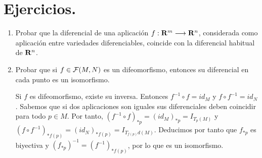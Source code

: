 \documentclass[cursovd_portada.tex]{subfiles}
\begin{document}
\section{Ejercicios.}
\begin{enumerate}
\item Probar que la diferencial de una aplicación $f:{\bf R}^m
\longrightarrow {\bf R}^n$, considerada como aplicación entre
variedades diferenciables, coincide con la diferencial habitual de
${\bf R}^n$. \item Probar que si $f\in{\cal F}(M,N)$ es un
difeomorfismo, entonces su diferencial en cada punto es un
isomorfismo. 


Si $f$ es difeomorfismo, existe su inversa. Entonces $f^{-1} \circ f = id_M$ y $f \circ f^{-1} = id_N$. Sabemos que si dos aplicaciones son iguales sus diferenciales deben coincidir para todo $p \in M$. Por tanto, $(f^{-1}\circ f)_{\ast p} = (id_M)_{\ast p} = I_{T_p(M)}$ y  $(f\circ f^{-1})_{\ast f(p)} = (id_N)_{\ast f(p)} = I_{T_{f(p)}d(M)}$. Deducimos por tanto que $f_{\ast p}$ es biyectiva y $(f_{\ast p})^{-1} = (f^{-1})_{\ast f(p)}$, por lo que es un isomorfismo.


\end{enumerate}
\end{document}
